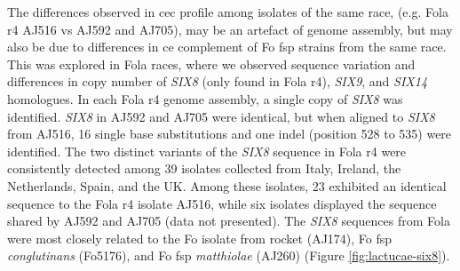 The differences observed in \ac{cec} profile among isolates of the same race, (e.g. \ac{Fola} \ac{r4} AJ516 vs AJ592 and AJ705), may be an artefact of genome assembly, but may also be due to differences in \ac{ce} complement of \ac{Fo} \ac{fsp} strains from the same race. This was explored in  \ac{Fola} races, where we observed sequence variation and differences in copy number of \textit{SIX8} (only found in \ac{Fola} \ac{r4}), \textit{SIX9}, and \textit{SIX14} homologues. In each \ac{Fola} \ac{r4} genome assembly, a single copy of \textit{SIX8} was identified. \textit{SIX8} in AJ592 and AJ705 were identical, but when aligned to \textit{SIX8} from AJ516, 16 single base substitutions and one indel (position 528 to 535) were identified. The two distinct variants of the \textit{SIX8} sequence in \ac{Fola} \ac{r4} were consistently detected among 39 isolates collected from Italy, Ireland, the Netherlands, Spain, and the UK. Among these isolates, 23 exhibited an identical sequence to the \ac{Fola} \ac{r4} isolate AJ516, while six isolates displayed the sequence shared by AJ592 and AJ705 (data not presented). The \textit{SIX8} sequences from \ac{Fola} were  most closely related to the \ac{Fo} isolate from rocket (AJ174), \ac{Fo} \ac{fsp} \textit{conglutinans} (Fo5176), and \ac{Fo} \ac{fsp} \textit{matthiolae} (AJ260) (Figure \ref{fig:lactucae-six8}).

